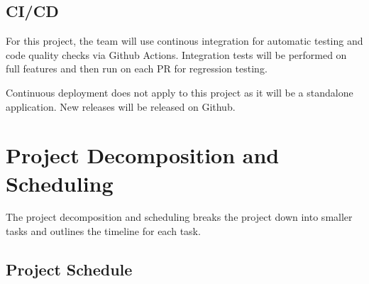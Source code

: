 \documentclass{article}
\begin{document}
\subsection{CI/CD}

For this project, the team will use continous integration for automatic testing and code quality checks via Github Actions. 
Integration tests will be performed on full features and then run on each PR for regression testing. 

Continuous deployment does not apply to this project as it will be a standalone application. New releases will
be released on Github.
\section{Project Decomposition and Scheduling}
The project decomposition and scheduling breaks the project down into smaller tasks and outlines the timeline for each task.

\subsection{Project Schedule}
\end{document}
